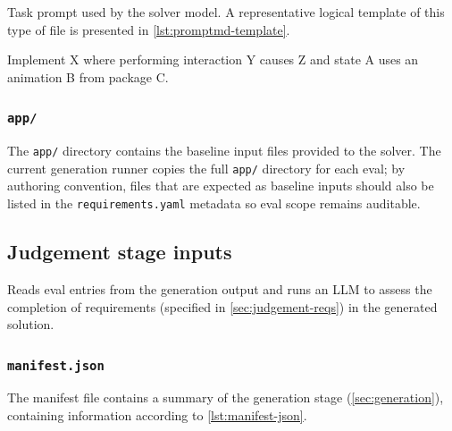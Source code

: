 \documentclass[11pt]{article}
\begin{document}
Task prompt used by the solver model. A representative logical template of this type of file is presented in \cref{lst:promptmd-template}.

\begin{listing}[h]
\begin{tcolorbox}[colback=gray!20,  %
                  colframe=gray!60, %
                  rounded corners,   %
                  boxrule=0.5mm,    %
                  left=4mm, right=4mm, top=2mm, bottom=2mm, %
                  title=\texttt{prompt.md} example]    %
Implement X where performing interaction Y causes Z and state A uses an animation B from package C.
\end{tcolorbox}
\caption{Example structure of a prompt in the benchmark.}
\label{lst:promptmd-template}
\end{listing}

\subsubsection{\texttt{app/}}

The \texttt{app/} directory contains the baseline input files provided to the solver. The current generation runner copies the full \texttt{app/} directory for each eval; by authoring convention, files that are expected as baseline inputs should also be listed in the \texttt{requirements.yaml} metadata so eval scope remains auditable.

\subsection{Judgement stage inputs}
\label{sec:judgement}

Reads eval entries from the generation output and runs an LLM to assess the completion of requirements (specified in \cref{sec:judgement-reqs}) in the generated solution.

\subsubsection{\texttt{manifest.json}}

The manifest file contains a summary of the generation stage (\cref{sec:generation}), containing information according to \cref{lst:manifest-json}.
\end{document}

